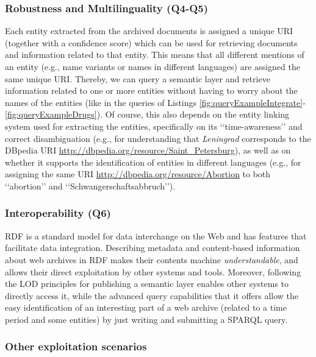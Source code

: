 \documentclass[twocolumn]{svjour3}
\newcommand{\q}[1]{\lq\lq{}{}#1\rq\rq{}{}}
\begin{document}
\subsubsection*{Robustness and Multilinguality (Q4-Q5)}
Each entity extracted from the archived documents
is assigned a unique URI (together with a confidence score)
which can be used for retrieving documents and information related to that entity.
This means that all different mentions of an entity
(e.g., name variants or names in different languages) are assigned the
same unique URI.
Thereby, we can query a semantic layer and retrieve information
related to one or more entities without having to worry
about the names of the entities (like in the queries
of Listings \ref{fig:queryExampleIntegrate}-\ref{fig:queryExampleDrugs}).
Of course, this also depends on the entity linking
system used for extracting the entities, specifically
on its \q{time-awareness} and correct disambiguation
(e.g., for understanding that {\em Leningrad} corresponds to the DBpedia URI
\url{http://dbpedia.org/resource/Saint_Petersburg}), as well as on
whether it supports
the identification of entities in different languages
(e.g., for assigning the same URI \url{http://dbpedia.org/resource/Abortion} to
both \q{abortion} and \q{Sch\-wa\-nger\-schaft\-sabbruch}).

\subsubsection*{Interoperability (Q6)}
RDF is a standard model for data interchange on the Web
and has features that facilitate data integration.
Describing metadata and content-based information about web archives in RDF
makes their contents machine {\em understandable}, and
allows their direct exploitation by other systems and tools.
Moreover, following the LOD principles for publishing a semantic layer
enables other systems to directly access it,
while the advanced query capabilities that it offers
allow the easy identification of an interesting part of a web archive
(related to a time period and some entities)
by just writing and submitting a SPARQL query.

\subsubsection*{Other exploitation scenarios}
\end{document}
